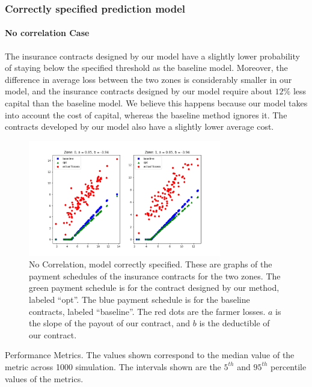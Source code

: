 \documentclass[11pt]{article}
\begin{document}
    \subsubsection{Correctly specified prediction model}
      \paragraph{No correlation Case} The insurance contracts designed by our model have a slightly lower probability of staying below the specified threshold as the baseline model. Moreover, the difference in average loss between the two zones is considerably smaller in our model, and the insurance contracts designed by our model require about $12\%$ less capital than the baseline model. We believe this happens because our model takes into account the cost of capital, whereas the baseline method ignores it. The contracts developed by our model also have a slightly lower average cost.  
      \begin{figure}[H]
          \centering
          \includegraphics[width=0.75\textwidth]{../../output/figures/Bootstrap/no_corr_linear.png}
          \caption{No Correlation, model correctly specified. These are graphs of the payment schedules of the insurance contracts for the two zones. The green payment schedule is for the contract designed by our method, labeled ``opt''. The blue payment schedule is for the baseline contracts, labeled ``baseline''. The red dots are the farmer losses. $a$ is the slope of the payout of our contract, and $b$ is the deductible of our contract.}
      \end{figure}

      \begin{table}[H]
          \centering
          
          \caption{Performance Metrics. The values shown correspond to the median value of the metric across 1000 simulation. The intervals shown are the $5^{th}$ and $95^{th}$ percentile values of the metrics.}
      \end{table}
      \FloatBarrier
\end{document}
